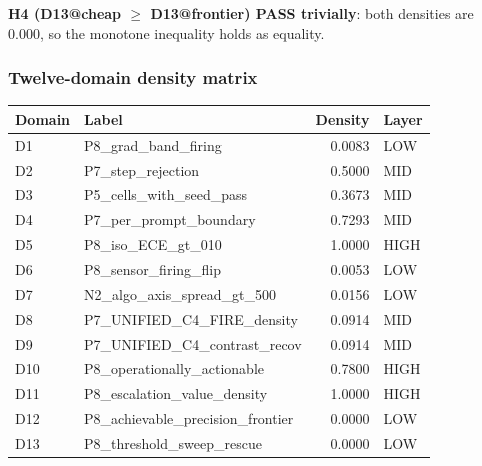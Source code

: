 \documentclass{article}
\begin{document}
\textbf{H4 (D13@cheap $\geq$ D13@frontier) PASS trivially}: both
densities are 0.000, so the monotone inequality holds as equality.

\subsubsection{Twelve-domain density matrix}
\begin{tabular}{llrl}
\hline
Domain & Label & Density & Layer \\
\hline
D1 & P8\_grad\_band\_firing & 0.0083 & LOW \\
D2 & P7\_step\_rejection & 0.5000 & MID \\
D3 & P5\_cells\_with\_seed\_pass & 0.3673 & MID \\
D4 & P7\_per\_prompt\_boundary & 0.7293 & MID \\
D5 & P8\_iso\_ECE\_gt\_010 & 1.0000 & HIGH \\
D6 & P8\_sensor\_firing\_flip & 0.0053 & LOW \\
D7 & N2\_algo\_axis\_spread\_gt\_500 & 0.0156 & LOW \\
D8 & P7\_UNIFIED\_C4\_FIRE\_density & 0.0914 & MID \\
D9 & P7\_UNIFIED\_C4\_contrast\_recov & 0.0914 & MID \\
D10 & P8\_operationally\_actionable & 0.7800 & HIGH \\
D11 & P8\_escalation\_value\_density & 1.0000 & HIGH \\
D12 & P8\_achievable\_precision\_frontier & 0.0000 & LOW \\
D13 & P8\_threshold\_sweep\_rescue & 0.0000 & LOW \\
\hline
\end{tabular}
\end{document}
